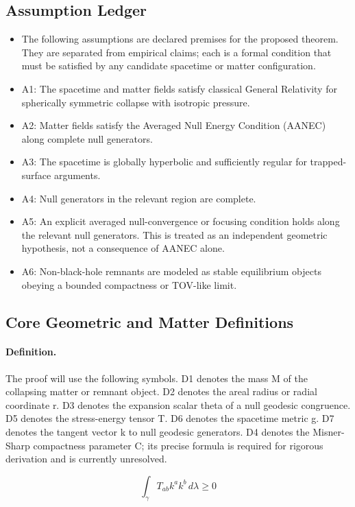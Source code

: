 \documentclass[conference]{IEEEtran}
\begin{document}
\subsection{Assumption Ledger}
\begin{itemize}
\item The following assumptions are declared premises for the proposed theorem. They are separated from empirical claims; each is a formal condition that must be satisfied by any candidate spacetime or matter configuration.
\item A1: The spacetime and matter fields satisfy classical General Relativity for spherically symmetric collapse with isotropic pressure.
\item A2: Matter fields satisfy the Averaged Null Energy Condition (AANEC) along complete null generators.
\item A3: The spacetime is globally hyperbolic and sufficiently regular for trapped-surface arguments.
\item A4: Null generators in the relevant region are complete.
\item A5: An explicit averaged null-convergence or focusing condition holds along the relevant null generators. This is treated as an independent geometric hypothesis, not a consequence of AANEC alone.
\item A6: Non-black-hole remnants are modeled as stable equilibrium objects obeying a bounded compactness or TOV-like limit.
\end{itemize}

\subsection{Core Geometric and Matter Definitions}
\paragraph{Definition.} The proof will use the following symbols. D1 denotes the mass M of the collapsing matter or remnant object. D2 denotes the areal radius or radial coordinate r. D3 denotes the expansion scalar theta of a null geodesic congruence. D5 denotes the stress-energy tensor T. D6 denotes the spacetime metric g. D7 denotes the tangent vector k to null geodesic generators. D4 denotes the Misner-Sharp compactness parameter C; its precise formula is required for rigorous derivation and is currently unresolved.

\begin{equation}
\int_{\gamma} T_{ab} k^{a} k^{b} \, d\lambda \geq 0
\label{eq:definitions-and-propositions-blk-equation}
\end{equation}
\end{document}
